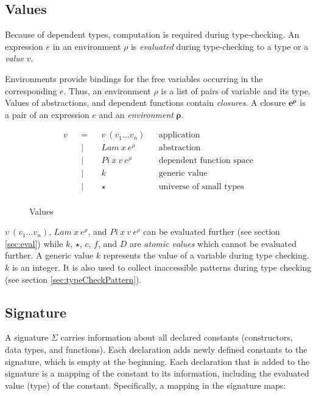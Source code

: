 \documentclass[acmsmall]{acmart}
\begin{document}
\subsection{Values}

Because of dependent types, computation is required during type-checking. An
expression $e$ in an environment $\rho$ is \emph{evaluated} during type-checking to a type or a \emph{value} $v$.

Environments provide bindings for the free variables occurring in the
corresponding $e$. Thus, an environment $\rho$ is a list of pairs of variable and its type. Values of abstractions, and dependent functions contain \emph{closures}. A closure $\boldsymbol{e^{\rho}}$ is a pair of an expression $e$ and an
\emph{environment} $\boldsymbol{\rho}$.

\begin{figure}[H]
  \begin{equation*}
    \label{eq:values}
    \begin{aligned}
      v &  & = &  & v \: (v_1 \dots v_n)     &  & \textrm{application}              \\
        &  & | &  & Lam \: x \: e^{\rho}     &  & \textrm{abstraction}              \\
        &  & | &  & Pi \: x \: v \: e^{\rho} &  & \textrm{dependent function space} \\
        &  & | &  & k                        &  & \textrm{generic value}            \\
        &  & | &  & \star                    &  & \textrm{universe of small types}  \\
    \end{aligned}
  \end{equation*}
  \caption{Values}
\end{figure}

$v \: (v_1 \dots v_n)$, $Lam \: x \: e^{\rho}$, and $Pi \: x \: v \: e^{\rho}$
can be evaluated further (see section \ref{sec:eval}) while $k$, $\star$, $c$, $f$, and $D$ are \emph{atomic values}
which cannot be evaluated further. A generic value $k$ represents the value of a variable during type
checking. $k$ is an integer. It is also used to collect inaccessible patterns during type checking (see section \ref{sec:typeCheckPattern}). 

\subsection{Signature}
A signature $\Sigma$ carries information about all declared constants (constructors, data types, and functions). Each declaration adds newly defined constants to the signature, which is empty at the beginning. Each declaration that is added to the signature is a mapping of the constant to its information, including the evaluated value (type) of the constant. Specifically, a mapping in the signature maps:
\end{document}
